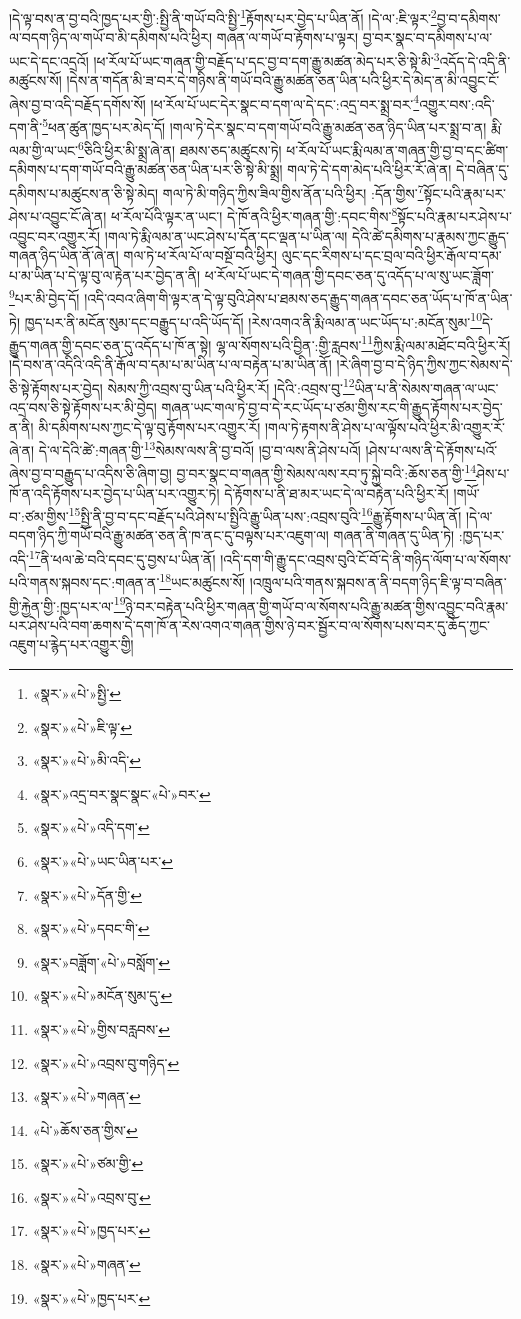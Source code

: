 །དེ་ལྟ་བས་ན་བྱ་བའི་ཁྱད་པར་གྱི་:སྤྱི་ནི་གཡོ་བའི་སྤྱི་\footnote{«སྣར་»«པེ་»སྤྱི་}རྟོགས་པར་བྱེད་པ་ཡིན་ནོ། །དེ་ལ་:ཇི་ལྟར་\footnote{«སྣར་»«པེ་»ཇི་ལྟ་}བྱ་བ་དམིགས་ལ་བདག་ཉིད་ལ་གཡོ་བ་མི་དམིགས་པའི་ཕྱིར། གཞན་ལ་གཡོ་བ་རྟོགས་པ་ལྟར། བྱ་བར་སྣང་བ་དམིགས་པ་ལ་ཡང་དེ་དང་འདྲའོ། །ཕ་རོལ་པོ་ཡང་གཞན་གྱི་བརྗོད་པ་དང་བྱ་བ་དག་རྒྱུ་མཚན་མེད་པར་ཅི་སྟེ་མི་\footnote{«སྣར་»«པེ་»མི་འདི་}འདོད་དེ་འདི་ནི་མཚུངས་སོ། །དེས་ན་གདོན་མི་ཟ་བར་དེ་གཉིས་ནི་གཡོ་བའི་རྒྱུ་མཚན་ཅན་ཡིན་པའི་ཕྱིར་དེ་མེད་ན་མི་འབྱུང་ངོ་ཞེས་བྱ་བ་འདི་བརྗོད་དགོས་སོ། །ཕ་རོལ་པོ་ཡང་དེར་སྣང་བ་དག་ལ་དེ་དང་:འདྲ་བར་སྨྲ་བར་\footnote{«སྣར་»འདྲ་བར་སྣང་སྣང་«པེ་»བར་}འགྱུར་བས་:འདི་དག་ནི་\footnote{«སྣར་»«པེ་»འདི་དག་}ཕན་ཚུན་ཁྱད་པར་མེད་དོ། །གལ་ཏེ་དེར་སྣང་བ་དག་གཡོ་བའི་རྒྱུ་མཚན་ཅན་ཉིད་ཡིན་པར་སྨྲ་བ་ན། རྨི་ལམ་གྱི་ལ་ཡང་\footnote{«སྣར་»«པེ་»ཡང་ཡིན་པར་}ཅིའི་ཕྱིར་མི་སྨྲ་ཞེ་ན། ཐམས་ཅད་མཚུངས་ཏེ། ཕ་རོལ་པོ་ཡང་རྨི་ལམ་ན་གཞན་གྱི་བྱ་བ་དང་ཚིག་དམིགས་པ་དག་གཡོ་བའི་རྒྱུ་མཚན་ཅན་ཡིན་པར་ཅི་སྟེ་མི་སྨྲ། གལ་ཏེ་དེ་དག་མེད་པའི་ཕྱིར་རོ་ཞེ་ན། དེ་བཞིན་དུ་དམིགས་པ་མཚུངས་ན་ཅི་སྟེ་མེད། གལ་ཏེ་མི་གཉིད་ཀྱིས་ཟིལ་གྱིས་ནོན་པའི་ཕྱིར། :དོན་གྱིས་\footnote{«སྣར་»«པེ་»དོན་གྱི་}སྟོང་པའི་རྣམ་པར་ཤེས་པ་འབྱུང་ངོ་ཞེ་ན། ཕ་རོལ་པོའི་ལྟར་ན་ཡང་། དེ་ཁོ་ནའི་ཕྱིར་གཞན་གྱི་:དབང་གིས་\footnote{«སྣར་»«པེ་»དབང་གི་}སྟོང་པའི་རྣམ་པར་ཤེས་པ་འབྱུང་བར་འགྱུར་རོ། །གལ་ཏེ་རྨི་ལམ་ན་ཡང་ཤེས་པ་དོན་དང་ལྡན་པ་ཡིན་ལ། དེའི་ཚེ་དམིགས་པ་རྣམས་ཀྱང་རྒྱུད་གཞན་ཉིད་ཡིན་ནོ་ཞེ་ན། གལ་ཏེ་ཕ་རོལ་པོ་ལ་བསྔོ་བའི་ཕྱིར། ལུང་དང་རིགས་པ་དང་བྲལ་བའི་ཕྱིར་རྒོལ་བ་དམ་པ་མ་ཡིན་པ་དེ་ལྟ་བུ་ལ་རྟེན་པར་བྱེད་ན་ནི། ཕ་རོལ་པོ་ཡང་དེ་གཞན་གྱི་དབང་ཅན་དུ་འདོད་པ་ལ་སུ་ཡང་ཟློག་\footnote{«སྣར་»བཟློག་«པེ་»བསློག་}པར་མི་བྱེད་དོ། །འདི་འབའ་ཞིག་གི་ལྟར་ན་དེ་ལྟ་བུའི་ཤེས་པ་ཐམས་ཅད་རྒྱུད་གཞན་དབང་ཅན་ཡོད་པ་ཁོ་ན་ཡིན་ཏེ། ཁྱད་པར་ནི་མངོན་སུམ་དང་བརྒྱུད་པ་འདི་ཡོད་དོ། །རེས་འགའ་ནི་རྨི་ལམ་ན་ཡང་ཡོད་པ་:མངོན་སུམ་\footnote{«སྣར་»«པེ་»མངོན་སུམ་དུ་}དེ་རྒྱུད་གཞན་གྱི་དབང་ཅན་དུ་འདོད་པ་ཁོ་ན་སྟེ། ལྷ་ལ་སོགས་པའི་བྱིན་:གྱི་རླབས་\footnote{«སྣར་»«པེ་»གྱིས་བརླབས་}ཀྱིས་རྨི་ལམ་མཐོང་བའི་ཕྱིར་རོ། །དེ་བས་ན་འདིའི་འདི་ནི་རྒོལ་བ་དམ་པ་མ་ཡིན་པ་ལ་བརྟེན་པ་མ་ཡིན་ནོ། །རེ་ཞིག་བྱ་བ་དེ་ཉིད་ཀྱིས་ཀྱང་སེམས་དེ་ཅི་སྟེ་རྟོགས་པར་བྱེད། སེམས་ཀྱི་འབྲས་བུ་ཡིན་པའི་ཕྱིར་རོ། །དེའི་:འབྲས་བུ་\footnote{«སྣར་»«པེ་»འབྲས་བུ་གཉིད་}ཡིན་པ་ནི་སེམས་གཞན་ལ་ཡང་འདྲ་བས་ཅི་སྟེ་རྟོགས་པར་མི་བྱེད། གཞན་ཡང་གལ་ཏེ་བྱ་བ་དེ་རང་ཡོད་པ་ཙམ་གྱིས་རང་གི་རྒྱུད་རྟོགས་པར་བྱེད་ན་ནི། མི་དམིགས་པས་ཀྱང་དེ་ལྟ་བུ་རྟོགས་པར་འགྱུར་རོ། །གལ་ཏེ་རྟགས་ནི་ཤེས་པ་ལ་ལྟོས་པའི་ཕྱིར་མི་འགྱུར་རོ་ཞེ་ན། དེ་ལ་དེའི་ཚེ་:གཞན་གྱི་\footnote{«སྣར་»«པེ་»གཞན་}སེམས་ལས་ནི་བྱ་བའོ། །བྱ་བ་ལས་ནི་ཤེས་པའོ། །ཤེས་པ་ལས་ནི་དེ་རྟོགས་པའོ་ཞེས་བྱ་བ་བརྒྱུད་པ་འདིས་ཅི་ཞིག་བྱ། བྱ་བར་སྣང་བ་གཞན་གྱི་སེམས་ལས་རབ་ཏུ་སྐྱེ་བའི་:ཆོས་ཅན་གྱི་\footnote{«པེ་»ཆོས་ཅན་གྱིས་}ཤེས་པ་ཁོ་ན་འདི་རྟོགས་པར་བྱེད་པ་ཡིན་པར་འགྱུར་ཏེ། དེ་རྟོགས་པ་ནི་ཐ་མར་ཡང་དེ་ལ་བརྟེན་པའི་ཕྱིར་རོ། །གཡོ་བ་:ཙམ་གྱིས་\footnote{«སྣར་»«པེ་»ཙམ་གྱི་}སྤྱི་ནི་བྱ་བ་དང་བརྗོད་པའི་ཤེས་པ་སྤྱིའི་རྒྱུ་ཡིན་པས་:འབྲས་བུའི་\footnote{«སྣར་»«པེ་»འབྲས་བུ་}རྒྱུ་རྟོགས་པ་ཡིན་ནོ། །དེ་ལ་བདག་ཉིད་ཀྱི་གཡོ་བའི་རྒྱུ་མཚན་ཅན་ནི་ཁ་ནང་དུ་བལྟས་པར་འཇུག་ལ། གཞན་ནི་གཞན་དུ་ཡིན་ཏེ། :ཁྱད་པར་འདི་\footnote{«སྣར་»«པེ་»ཁྱད་པར་}ནི་ཕལ་ཆེ་བའི་དབང་དུ་བྱས་པ་ཡིན་ནོ། །འདི་དག་གི་རྒྱུ་དང་འབྲས་བུའི་ངོ་བོ་དེ་ནི་གཉིད་ལོག་པ་ལ་སོགས་པའི་གནས་སྐབས་དང་:གཞན་ན་\footnote{«སྣར་»«པེ་»གཞན་}ཡང་མཚུངས་སོ། །འཁྲུལ་པའི་གནས་སྐབས་ན་ནི་བདག་ཉིད་ཇི་ལྟ་བ་བཞིན་གྱི་རྐྱེན་གྱི་:ཁྱད་པར་ལ་\footnote{«སྣར་»«པེ་»ཁྱད་པར་}ཉེ་བར་བརྟེན་པའི་ཕྱིར་གཞན་གྱི་གཡོ་བ་ལ་སོགས་པའི་རྒྱུ་མཚན་གྱིས་འབྱུང་བའི་རྣམ་པར་ཤེས་པའི་བག་ཆགས་དེ་དག་ཁོ་ན་རེས་འགའ་གཞན་གྱིས་ཉེ་བར་སྦྱོར་བ་ལ་སོགས་པས་བར་དུ་ཆོད་ཀྱང་འཇུག་པ་རྙེད་པར་འགྱུར་གྱི། 